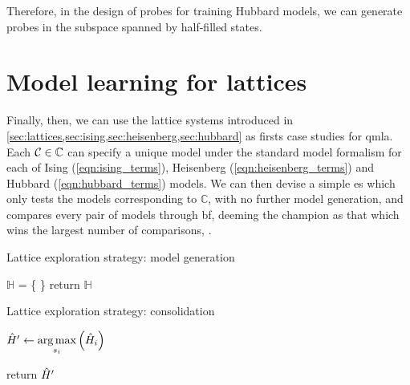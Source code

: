 Therefore, in the design of probes for training Hubbard models, 
    we can generate probes in the subspace spanned by half-filled states. 

\section{Model learning for lattices}
Finally, then, we can use the lattice systems introduced in \cref{sec:lattices,sec:ising,sec:heisenberg,sec:hubbard}
    as firsts case studies for \gls{qmla}. 
Each ${ \mathcal{C}} \in \mathbb{C}$ can specify a unique model under the standard model formalism
    for each of Ising (\cref{eqn:ising_terms}), Heisenberg (\cref{eqn:heisenberg_terms}) 
    and Hubbard (\cref{eqn:hubbard_terms}) models. 
We can then devise a simple \gls{es} which only tests the models corresponding to $\mathbb{C}$, 
    with no further model generation, and compares every pair of models through \gls{bf}, 
    deeming the champion as that which wins the largest number of comparisons, 
    .

    \begin{algorithm}
        \caption{Lattice exploration strategy: model generation}
        \label{alg:lattice_exploration_strategy}
        \DontPrintSemicolon
    
        \;

        $\mathbb{H}$ = \{ \}\;
        return $\mathbb{H}$
    \end{algorithm}
    
    \begin{algorithm}
        \caption{Lattice exploration strategy: consolidation}
        \label{alg:lattice_exploration_strategy_consolidation}
        \DontPrintSemicolon
    
        \;


        $\hat{H}^{\prime} \gets \operatorname*{arg\,max}\limits_{s_i} \left(\hat{H}_i\right)$

        return $\hat{H}^{\prime}$
    \end{algorithm}



    